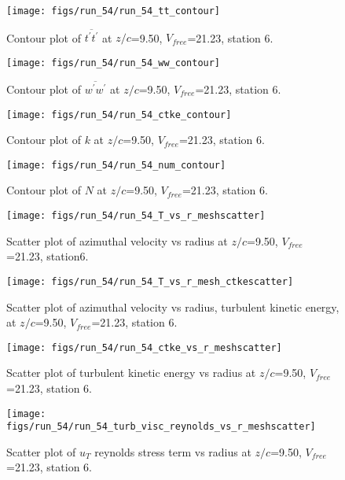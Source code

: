 \begin{figure}[H]
\centering
\texttt{[image: figs/run\_54/run\_54\_tt\_contour]}
\caption{Contour plot of $\overline{t^\prime t^\prime}$ at $z/c$=9.50, $V_{free}$=21.23, station 6.}
\end{figure}


\begin{figure}[H]
\centering
\texttt{[image: figs/run\_54/run\_54\_ww\_contour]}
\caption{Contour plot of $\overline{w^\prime w^\prime}$ at $z/c$=9.50, $V_{free}$=21.23, station 6.}
\end{figure}


\begin{figure}[H]
\centering
\texttt{[image: figs/run\_54/run\_54\_ctke\_contour]}
\caption{Contour plot of $k$ at $z/c$=9.50, $V_{free}$=21.23, station 6.}
\end{figure}


\begin{figure}[H]
\centering
\texttt{[image: figs/run\_54/run\_54\_num\_contour]}
\caption{Contour plot of $N$ at $z/c$=9.50, $V_{free}$=21.23, station 6.}
\end{figure}


\begin{figure}[H]
\centering
\texttt{[image: figs/run\_54/run\_54\_T\_vs\_r\_meshscatter]}
\caption{Scatter plot of azimuthal velocity vs radius at $z/c$=9.50, $V_{free}$=21.23, station6.}
\end{figure}


\begin{figure}[H]
\centering
\texttt{[image: figs/run\_54/run\_54\_T\_vs\_r\_mesh\_ctkescatter]}
\caption{Scatter plot of azimuthal velocity vs radius, turbulent kinetic energy, at $z/c$=9.50, $V_{free}$=21.23, station 6.}
\end{figure}


\begin{figure}[H]
\centering
\texttt{[image: figs/run\_54/run\_54\_ctke\_vs\_r\_meshscatter]}
\caption{Scatter plot of turbulent kinetic energy vs radius at $z/c$=9.50, $V_{free}$=21.23, station 6.}
\end{figure}


\begin{figure}[H]
\centering
\texttt{[image: figs/run\_54/run\_54\_turb\_visc\_reynolds\_vs\_r\_meshscatter]}
\caption{Scatter plot of $
u_T$ reynolds stress term vs radius at $z/c$=9.50, $V_{free}$=21.23, station 6.}
\end{figure}



